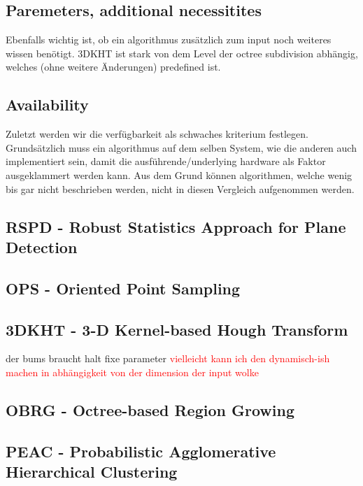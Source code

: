 \documentclass[main.tex]{subfiles}
\begin{document}
\subsection*{Paremeters, additional necessitites}
Ebenfalls wichtig ist, ob ein algorithmus zusätzlich zum input noch weiteres wissen benötigt. 3DKHT ist stark von dem Level der
octree subdivision abhängig, welches (ohne weitere Änderungen) predefined ist.

\subsection*{Availability}
Zuletzt werden wir die verfügbarkeit als schwaches kriterium festlegen.
Grundsätzlich muss ein algorithmus auf dem selben System, wie die anderen auch implementiert sein, damit die ausführende/underlying hardware
als Faktor ausgeklammert werden kann. Aus dem Grund können algorithmen, welche wenig bis gar nicht beschrieben werden, nicht in diesen Vergleich
aufgenommen werden.



\subsection*{RSPD - Robust Statistics Approach for Plane Detection}

\subsection*{OPS - Oriented Point Sampling}

\subsection*{3DKHT - 3-D Kernel-based Hough Transform}
der bums braucht halt fixe parameter
\textcolor{red}{vielleicht kann ich den dynamisch-ish machen in abhängigkeit von der dimension der input wolke}

\subsection*{OBRG - Octree-based Region Growing}
\subsection*{PEAC - Probabilistic Agglomerative Hierarchical Clustering}
\end{document}
